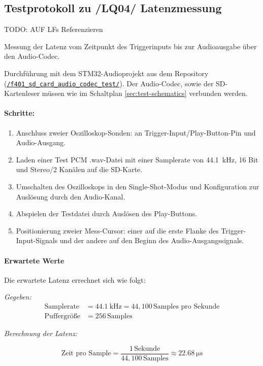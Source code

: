 \subsection{Testprotokoll zu /LQ04/ Latenzmessung}
\label{test-latenzmessung}

TODO: AUF LFs Referenzieren

Messung der Latenz vom Zeitpunkt des Triggerinputs bis zur Audioausgabe über den Audio-Codec.

Durchführung mit dem STM32-Audioprojekt aus dem Repository (\href{run:../../f401_sd_card_audio_codec_test/}{\texttt{/f401\_sd\_card\_audio\_codec\_test/}}).
Der Audio-Codec, sowie der SD-Kartenleser müssen wie im Schaltplan \ref{sec:test-schematics} verbunden werden.

\paragraph{Schritte:}
\begin{enumerate}
	\item Anschluss zweier Oszilloskop-Sonden: an Trigger-Input/Play-Button-Pin und Audio-Ausgang.
	\item Laden einer Test PCM .wav-Datei mit einer Samplerate von \SI{44.1}{\kilo\hertz}, 16 Bit und Stereo/2 Kanälen auf die SD-Karte.
	\item Umschalten des Oszilloskops in den Single-Shot-Modus und Konfiguration zur Auslösung durch den Audio-Kanal.
	\item Abspielen der Testdatei durch Auslösen des Play-Buttons.
	\item Positionierung zweier Mess-Cursor: einer auf die erste Flanke des Trigger-Input-Signals und der andere auf den Beginn des Audio-Ausgangssignals.
\end{enumerate}
\paragraph{Erwartete Werte}
	Die erwartete Latenz errechnet sich wie folgt:
	
	\textit{Gegeben:}
	\begin{align*}
		\text{Samplerate} &= \SI{44.1}{\kilo\hertz} = 44{,}100 \, \text{Samples pro Sekunde} \\
		\text{Puffergröße} &= 256 \, \text{Samples}
	\end{align*}
	
	\textit{Berechnung der Latenz:}
	
	\[
	\text{Zeit pro Sample} = \frac{1 \, \text{Sekunde}}{44{,}100 \, \text{Samples}} \approx \SI{22.68}{\micro\second}
	\]
	
